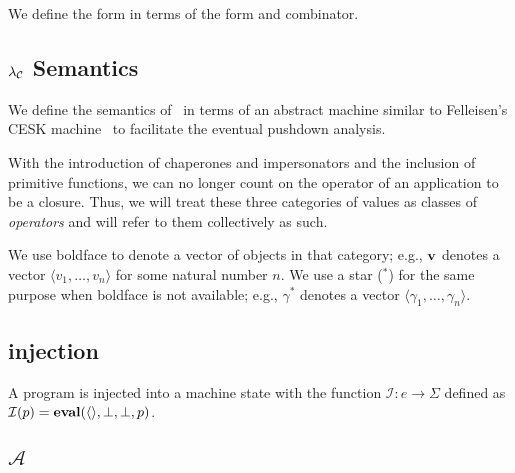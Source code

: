 \newcommand{\clo}[2]{\nttwo{clos}{#1}{#2}}
\newcommand{\imp}[2]{\ntthr{imp}{\ell}{#1}{#2}}
\newcommand{\cha}[2]{\ntthr{chap}{\ell}{#1}{#2}}

\newcommand{\letk}[3]{\mathrm{let}_\kappa(#1,#2,#3)}

\newcommand{\impcwk}[2]{\ntthr{imp\mhyphen neg}{\ell}{#1}{#2}}
\newcommand{\impcfk}[1]{\nttwo{imp\mhyphen fun}{\ell}{#1}}
\newcommand{\impcrk}[1]{\nttwo{imp\mhyphen pos}{\ell}{#1}}

\newcommand{\chacwk}[2]{\ntthr{chap\mhyphen neg}{\ell}{#1}{#2}}
\newcommand{\chacfk}[1]{\nttwo{chap\mhyphen fun}{\ell}{#1}}
\newcommand{\chacrk}[1]{\nttwo{chap\mhyphen pos}{\ell}{#1}}

\newcommand{\rr}{\longrightarrow}
\newcommand{\rrs}{\longrightarrow^{*}}

We define the  form in terms of the  form and  combinator.

\subsection{$\lambda_{\mathcal{C}}$ Semantics}

We define the semantics of \chapcalc\ in terms of an abstract machine similar to Felleisen's CESK machine~\cite{felleisen1987calculus} to facilitate the eventual pushdown analysis.

With the introduction of chaperones and impersonators and the inclusion of primitive functions, we can no longer count on the operator of an application to be a closure.
Thus, we will treat these three categories of values as classes of \emph{operators} and will refer to them collectively as such.

We use boldface to denote a vector of objects in that category; e.g., $\mathbf{v}$ denotes a vector $\langle v_1,\dots,v_n\rangle$ for some natural number $n$.
We use a star ($^*$) for the same purpose when boldface is not available; e.g., $\gamma^*$ denotes a vector $\langle\gamma_1,\dots,\gamma_n\rangle$.

\subsection{injection}

A program is injected into a machine state with the function $\mathcal{I} : e\rightarrow\Sigma$ defined as $\mathcal{I}(p)=\mathbf{eval}(\langle\rangle,\perp,\perp,p)$.

\subsection{$\mathcal{A}$}

